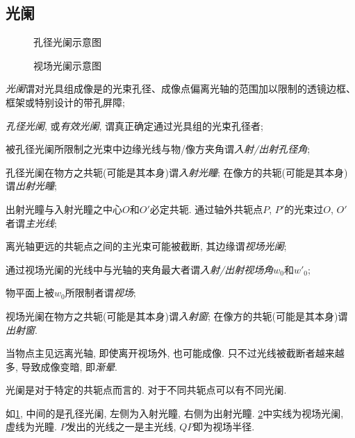\documentclass{ctexart}
\begin{document}


\subsection{光阑} %
\label{sub:光阑}

\begin{figure}[ht]
    \centering
    \caption{孔径光阑示意图}
    \label{fig:孔径光阑示意图}
\end{figure}
\begin{figure}[ht]
    \centering
    \caption{视场光阑示意图}
    \label{fig:视场光阑示意图}
\end{figure}
\begin{cenum}
    \item \emph{光阑}谓对光具组成像是的光束孔径、成像点偏离光轴的范围加以限制的透镜边框、框架或特别设计的带孔屏障;
    \item \emph{孔径光阑}, 或\emph{有效光阑}, 谓真正确定通过光具组的光束孔径者;
    \item 被孔径光阑所限制之光束中边缘光线与物/像方夹角谓\emph{入射/出射孔径角};
    \item 孔径光阑在物方之共轭(可能是其本身)谓\emph{入射光瞳}; 在像方的共轭(可能是其本身)谓\emph{出射光瞳};
    \item 出射光瞳与入射光瞳之中心$O$和$O'$必定共轭. 通过轴外共轭点$P$, $P'$的光束过$O$, $O'$者谓\emph{主光线};
    \item 离光轴更远的共轭点之间的主光束可能被截断, 其边缘谓\emph{视场光阑};
    \item 通过视场光阑的光线中与光轴的夹角最大者谓\emph{入射/出射视场角}$w_0$和$w'_0$;
    \item 物平面上被$w_0$所限制者谓\emph{视场};
    \item 视场光阑在物方之共轭(可能是其本身)谓\emph{入射窗}; 在像方的共轭(可能是其本身)谓\emph{出射窗}.
\end{cenum}
当物点主见远离光轴, 即使离开视场外, 也可能成像. 只不过光线被截断者越来越多, 导致成像变暗, 即\emph{渐晕}.
\begin{pitfall}
    光阑是对于特定的共轭点而言的. 对于不同共轭点可以有不同光阑.
\end{pitfall}
如\cref{fig:孔径光阑示意图}, 中间的是孔径光阑, 左侧为入射光瞳, 右侧为出射光瞳. \cref{fig:视场光阑示意图}中实线为视场光阑, 虚线为光瞳. $P$发出的光线之一是主光线, $QP$即为视场半径.
\end{document}
